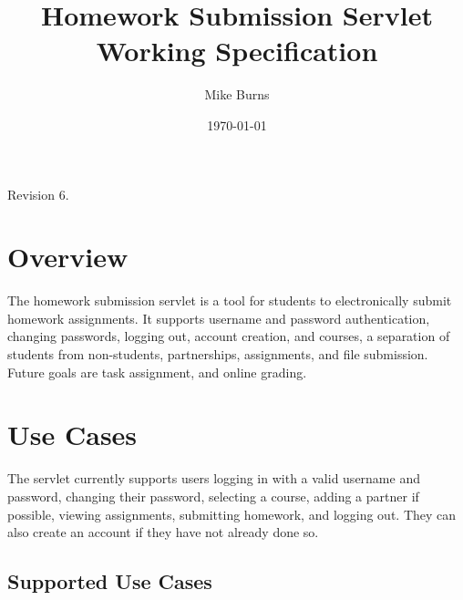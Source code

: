 \documentclass[a4paper]{article}
\begin{document}
\title{Homework Submission Servlet Working Specification}
\author{Mike Burns}
\date{\today}

\maketitle

Revision 6.

\section{Overview}\label{sec:overview}

The homework submission servlet is a tool for students to electronically submit
homework assignments. It supports username and password authentication,
changing passwords, logging out, account creation, and courses, a separation of
students from non-students, partnerships, assignments, and file submission.
Future goals are task assignment, and online grading.

\section{Use Cases}\label{sec:usecases}

The servlet currently supports users logging in with a valid username and
password, changing their password, selecting a course, adding a partner if
possible, viewing assignments, submitting homework, and logging out. They can
also create an account if they have not already done so.

\subsection{Supported Use Cases}\label{subsec:detailed-usecases}
\end{document}
